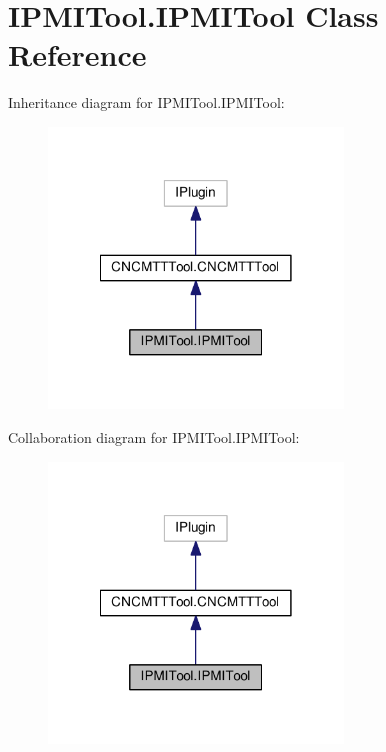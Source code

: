 \hypertarget{classIPMITool_1_1IPMITool}{\section{I\-P\-M\-I\-Tool.\-I\-P\-M\-I\-Tool Class Reference}
\label{classIPMITool_1_1IPMITool}
}


Inheritance diagram for I\-P\-M\-I\-Tool.\-I\-P\-M\-I\-Tool\-:
\nopagebreak
\begin{figure}[H]
\begin{center}
\leavevmode
\includegraphics[width=222pt]{classIPMITool_1_1IPMITool__inherit__graph}
\end{center}
\end{figure}


Collaboration diagram for I\-P\-M\-I\-Tool.\-I\-P\-M\-I\-Tool\-:
\nopagebreak
\begin{figure}[H]
\begin{center}
\leavevmode
\includegraphics[width=222pt]{classIPMITool_1_1IPMITool__coll__graph}
\end{center}
\end{figure}
